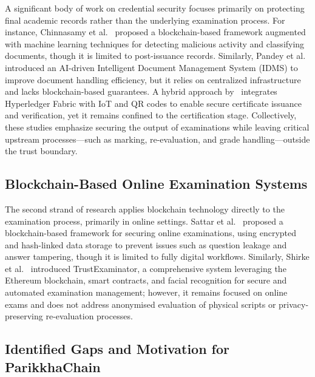 \documentclass[conference]{IEEEtran}
\begin{document}
A significant body of work on credential security focuses primarily on protecting final academic records rather than the underlying examination process. For instance, Chinnasamy et al.~\cite{chinnasamy2025blockchain} proposed a blockchain-based framework augmented with machine learning techniques for detecting malicious activity and classifying documents, though it is limited to post-issuance records. Similarly, Pandey et al.~\cite{pandey2023idms} introduced an AI-driven Intelligent Document Management System (IDMS) to improve document handling efficiency, but it relies on centralized infrastructure and lacks blockchain-based guarantees. A hybrid approach by~\cite{hybrid2024maritime} integrates Hyperledger Fabric with IoT and QR codes to enable secure certificate issuance and verification, yet it remains confined to the certification stage. Collectively, these studies emphasize securing the output of examinations while leaving critical upstream processes—such as marking, re-evaluation, and grade handling—outside the trust boundary.
\subsection{Blockchain-Based Online Examination Systems}
The second strand of research applies blockchain technology directly to the examination process, primarily in online settings. Sattar et al.~\cite{sattar2023advanced} proposed a blockchain-based framework for securing online examinations, using encrypted and hash-linked data storage to prevent issues such as question leakage and answer tampering, though it is limited to fully digital workflows. Similarly, Shirke et al.~\cite{shirke2025trustexaminator} introduced TrustExaminator, a comprehensive system leveraging the Ethereum blockchain, smart contracts, and facial recognition for secure and automated examination management; however, it remains focused on online exams and does not address anonymised evaluation of physical scripts or privacy-preserving re-evaluation processes.
 
\subsection{Identified Gaps and Motivation for ParikkhaChain}
 
\end{document}
